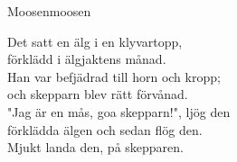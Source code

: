 \begin{song}{Moosen}{moosen}
\begin{vers}
Det satt en älg i en klyvartopp,\\
förklädd i älgjaktens månad.\\
Han var befjädrad till horn och kropp;\\
och skepparn blev rätt förvånad.\\
"Jag är en mås, goa skepparn!", ljög den\\
förklädda älgen och sedan flög den.\\
Mjukt landa den,
på skepparen.\\
\end{vers}
\end{song}
